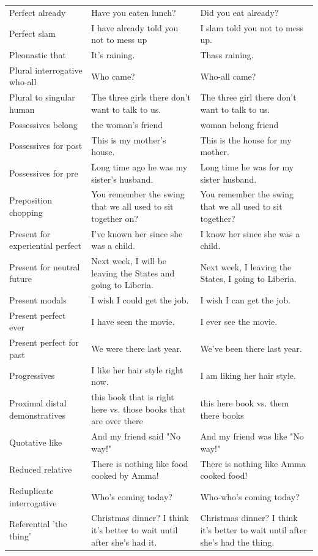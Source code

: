 \begin{longtable}{
  >{\raggedright\arraybackslash}p{3.2cm}
  >{\raggedright\arraybackslash}p{4.8cm}
  >{\raggedright\arraybackslash}p{4.8cm}
}
Perfect already & Have you eaten lunch? & Did you eat already? \\
Perfect slam & I have already told you not to mess up & I slam told you not to mess up. \\
Pleonastic that & It's raining. & Thass raining. \\
Plural interrogative who-all & Who came? & Who-all came? \\
Plural to singular human & The three girls there don't want to talk to us. & The three girl there don't want to talk to us. \\
Possessives belong & the woman's friend & woman belong friend \\
Possessives for post & This is my mother's house. & This is the house for my mother. \\
Possessives for pre & Long time ago he was my sister's husband. & Long time he was for my sister husband. \\
Preposition chopping & You remember the swing that we all used to sit together on? & You remember the swing that we all used to sit together? \\
Present for experiential perfect & I've known her since she was a child. & I know her since she was a child. \\
Present for neutral future & Next week, I will be leaving the States and going to Liberia. & Next week, I leaving the States, I going to Liberia. \\
Present modals & I wish I could get the job. & I wish I can get the job. \\
Present perfect ever & I have seen the movie. & I ever see the movie. \\
Present perfect for past & We were there last year. & We've been there last year. \\
Progressives & I like her hair style right now. & I am liking her hair style. \\
Proximal distal demonstratives & this book that is right here vs. those books that are over there & this here book vs. them there books \\
Quotative like & And my friend said "No way!" & And my friend was like "No way!" \\
Reduced relative & There is nothing like food cooked by Amma! & There is nothing like Amma cooked food! \\
Reduplicate interrogative & Who's coming today? & Who-who's coming today? \\
Referential 'the thing' & Christmas dinner? I think it's better to wait until after she's had it. & Christmas dinner? I think it's better to wait until after she's had the thing. \\

\end{longtable}
